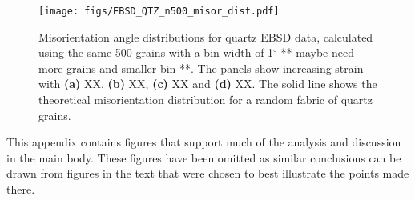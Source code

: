 \documentclass[a4paper,12pt,twoside]{report}
\numberwithin{equation}{chapter}
\begin{document}
\begin{figure}[h]
  \centering
    \texttt{[image: figs/EBSD\_QTZ\_n500\_misor\_dist.pdf]}
  \caption[Misorientation angle distribution (quartz EBSD)]{Misorientation angle distributions for quartz EBSD data, calculated using the same 500 grains with a bin width of 1$^{\circ}$ ** maybe need more grains and smaller bin **. The panels show increasing strain with \textbf{(a)} XX, \textbf{(b)} XX, \textbf{(c)} XX and \textbf{(d)} XX. The solid line shows the theoretical misorientation distribution for a random fabric of quartz grains. } 
  \label{fig:APP_misor_dist_qtz_ebsd}
\end{figure} 

This appendix contains figures that support much of the analysis and discussion in the main body. These figures have been omitted as similar conclusions can be drawn from figures in the text that were chosen to best illustrate the points made there. 


\newpage
\end{document}
